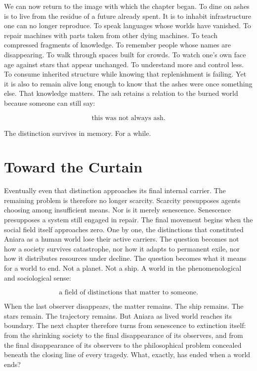 \documentclass[11pt,oneside]{book}
\theoremstyle{definition}
\theoremstyle{remark}
\begin{document}
We can now return to the image with which the chapter began. To dine on ashes is to live from the
residue of a future already spent. It is to inhabit infrastructure one can no longer reproduce. To
speak languages whose worlds have vanished. To repair machines with parts taken from other dying
machines. To teach compressed fragments of knowledge. To remember people whose names are
disappearing. To walk through spaces built for crowds. To watch one's own face age against stars
that appear unchanged. To understand more and control less. To consume inherited structure while
knowing that replenishment is failing. Yet it is also to remain alive long enough to know that the
ashes were once something else. That knowledge matters. The ash retains a relation to the burned
world because someone can still say:

\[
\text{this was not always ash}.
\]

The distinction survives in memory. For a while.

\section{Toward the Curtain}

Eventually even that distinction approaches its final internal carrier. The remaining problem is
therefore no longer scarcity. Scarcity presupposes agents choosing among insufficient means. Nor is
it merely senescence. Senescence presupposes a system still engaged in repair. The final movement
begins when the social field itself approaches zero. One by one, the distinctions that constituted
Aniara as a human world lose their active carriers. The question becomes not how a society survives
catastrophe, nor how it adapts to permanent exile, nor how it distributes resources under decline.
The question becomes what it means for a world to end. Not a planet. Not a ship. A world in the
phenomenological and sociological sense:

\[
\text{a field of distinctions that matter to someone}.
\]

When the last observer disappears, the matter remains. The ship remains. The stars remain. The
trajectory remains. But Aniara as lived world reaches its boundary. The next chapter therefore turns
from senescence to extinction itself: from the shrinking society to the final disappearance of its
observers, and from the final disappearance of its observers to the philosophical problem concealed
beneath the closing line of every tragedy. What, exactly, has ended when a world ends?
\end{document}
